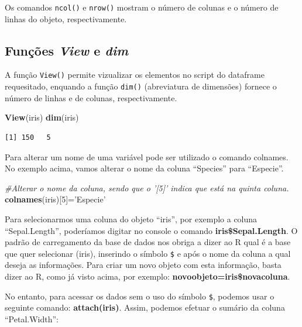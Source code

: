 \documentclass[12pt,brazil,oneside]{book}
\newenvironment{Shaded}{\begin{snugshade}}{\end{snugshade}}
\newcommand{\CommentTok}[1]{\textcolor[rgb]{0.56,0.35,0.01}{\textit{#1}}}
\newcommand{\DecValTok}[1]{\textcolor[rgb]{0.00,0.00,0.81}{#1}}
\newcommand{\KeywordTok}[1]{\textcolor[rgb]{0.13,0.29,0.53}{\textbf{#1}}}
\newcommand{\NormalTok}[1]{#1}
\newcommand{\StringTok}[1]{\textcolor[rgb]{0.31,0.60,0.02}{#1}}
\begin{document}
Os comandos \texttt{ncol()} e \texttt{nrow()} mostram o número de colunas e o número de linhas do objeto, respectivamente.

\hypertarget{funcoes-view-e-dim}{%
\subsection{\texorpdfstring{Funções \emph{View} e \emph{dim}}{Funções View e dim}}\label{funcoes-view-e-dim}}

A função \texttt{View()} permite vizualizar os elementos no script do dataframe requesitado, enquando a função \texttt{dim()} (abreviatura de dimensões) fornece o número de linhas e de colunas, respectivamente.

\begin{Shaded}
\begin{Highlighting}[]
\KeywordTok{View}\NormalTok{(iris)}
\KeywordTok{dim}\NormalTok{(iris)}
\end{Highlighting}
\end{Shaded}

\begin{verbatim}
[1] 150   5
\end{verbatim}

Para alterar um nome de uma variável pode ser utilizado o comando colnames. No exemplo acima, vamos alterar o nome da coluna ``Species'' para ``Especie''.

\begin{Shaded}
\begin{Highlighting}[]
\CommentTok{#Alterar o nome da coluna, sendo que o '[5]' indica que está na quinta coluna.}
\KeywordTok{colnames}\NormalTok{(iris)[}\DecValTok{5}\NormalTok{]=}\StringTok{'Especie'}
\end{Highlighting}
\end{Shaded}

Para selecionarmos uma coluna do objeto ``iris'', por exemplo a coluna ``Sepal.Length'', poderíamos digitar no console o comando \textbf{iris\$Sepal.Length}. O padrão de carregamento da base de dados nos obriga a dizer ao R qual é a base que quer selecionar (iris), inserindo o símbolo \texttt{\$} e após o nome da coluna a qual deseja as informações. Para criar um novo objeto com esta informação, basta dizer ao R, como já visto acima, por exemplo: \textbf{novoobjeto=iris\$novacoluna}.

No entanto, para acessar os dados sem o uso do símbolo \texttt{\$}, podemos usar o seguinte comando: \textbf{attach(iris)}. Assim, podemos efetuar o sumário da coluna ``Petal.Width'':
\end{document}
